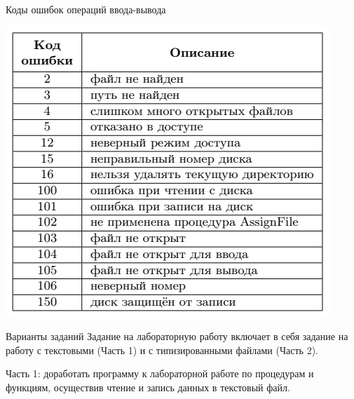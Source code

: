 \documentclass{beamer}
\begin{document}
\begin{frame}
\begin{block}{Коды ошибок операций ввода-вывода}
\begin{center}
\includegraphics[scale=0.6]{images/ioresult.png}
\end{center}
\end{block}
\end{frame}

\begin{frame}{Варианты заданий}
Задание на лабораторную работу включает в себя задание на работу с текстовыми (Часть 1) и с типизированными файлами (Часть 2).

Часть 1: доработать программу к лабораторной работе по процедурам и функциям, осуществив
чтение и запись данных в текстовый файл.
\end{frame}
\end{document}
